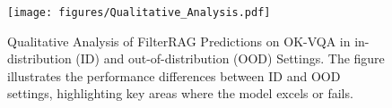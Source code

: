 
\clearpage
\begin{figure}[!h]
    \centering
    \begin{minipage}{\textwidth}
        \centering
        \texttt{[image: figures/Qualitative\_Analysis.pdf]}
        \captionsetup{justification=raggedright, singlelinecheck=false}  %
        \caption{Qualitative Analysis of FilterRAG Predictions on OK-VQA in in-distribution (ID) and out-of-distribution (OOD) Settings. The figure illustrates the performance differences between ID and OOD settings, highlighting key areas where the model excels or fails.}
        \label{fig:Qualitative_Analysis}
    \end{minipage}
\end{figure}
